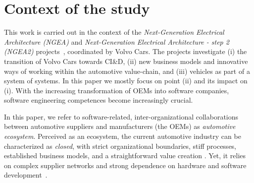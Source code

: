 \section{Context of the study}\label{sec:context}


This work is carried out in the context of the {\em Next-Generation Electrical Architecture (NGEA)} and {\em Next-Generation Electrical Architecture - step 2 (NGEA2)} projects~\cite{Vinnova}, coordinated by Volvo Cars. %
The projects investigate (i) the transition of %
Volvo Cars 
towards CI\&D, (ii) new business models and innovative ways of working within the automotive %
value-chain, %
and (iii) vehicles as part of a system of systems. 
In this paper we mostly focus on point (ii) %
and its impact on (i). %
With the increasing transformation of OEMs into software companies, software engineering competences become increasingly crucial. %

{In this paper, we refer to software-related, }%
inter-organizational collaborations between automotive suppliers %
{and manufacturers (the OEMs) as \emph{automotive ecosystem}}. %
Perceived as an ecosystem, the current automotive industry can be characterized as \emph{closed}, with strict organizational boundaries, stiff processes, established business models, and a straightforward value creation \cite{ConnectedVehicle2012}.
Yet, it relies on complex supplier networks  and strong dependence on hardware and software development~\cite{Knauss2014d}. %


